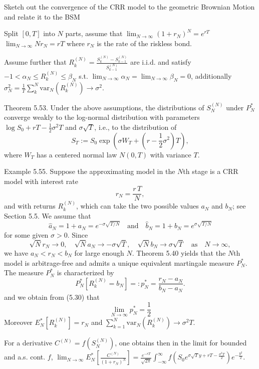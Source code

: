 Sketch out the convergence of the CRR
model to the geometric Brownian Motion
and relate it to the BSM

Split \( [0, T] \) into \( N \) parts, assume that
\( \lim_{N \to \infty} (1 + r_N)^N = e^{rT} \)
\( \lim_{N \to \infty} Nr_N = rT \)
where \( r_N \) is the rate of the riskless bond.

Assume further that
\( R^{(N)}_k = \frac{S^{(N)}_k - S^{(N)}_{k-1}}{S^{(N)}_{k-1}} \)
are i.i.d. and satisfy \( -1 < \alpha_N \leq R^{(N)}_k \leq \beta_N \)
s.t. \( \lim_{N \to \infty} \alpha_N = \lim_{N \to \infty} \beta_N = 0 \),
additionally \( \sigma_N^2 = \frac{1}{T} \sum_{k}^N \text{var}_N(R^{(N)}_k) \to \sigma^2 \).

Theorem 5.53. Under the above assumptions, the distributions of \( S^{(N)}_N \) under \( P^\ast_N \) converge weakly to the 
log-normal distribution with parameters \(\log S_0 + rT - \frac{1}{2} \sigma^2 T\) and \(\sigma \sqrt{T}\), i.e., to the distribution of
\[
S_T := S_0 \exp \left( \sigma W_T + \left( r - \frac{1}{2} \sigma^2 \right) T \right),
\]
where \( W_T \) has a centered normal law \( N(0,T) \) with variance \( T \).

Example 5.55. Suppose the approximating model in the \( N \)th stage is a CRR model with interest rate
\[
r_N = \frac{r \, T}{N},
\]
and with returns \( R^{(N)}_k \), which can take the two possible values \( a_N \) and \( b_N \); see Section 5.5. We assume that
\[
\hat{a}_N = 1 + a_N = e^{-\sigma \sqrt{T/N}} \quad \text{and} \quad \hat{b}_N = 1 + b_N = e^{\sigma \sqrt{T/N}}
\]
for some given \(\sigma > 0\). Since
\[
\sqrt{N} r_N \to 0, \quad \sqrt{N} a_N \to -\sigma \sqrt{T}, \quad \sqrt{N} b_N \to \sigma \sqrt{T} \quad \text{as} \quad N \to \infty,
\]
we have \( a_N < r_N < b_N \) for large enough \( N \). 
Theorem 5.40 yields that the \( N \)th model is arbitrage-free and admits a unique equivalent martingale measure \( P^*_N \). 
The measure \( P^*_N \) is characterized by
\[
P^*_N \left[ R^{(N)}_k = b_N \right] =: p^*_N = \frac{r_N - a_N}{b_N - a_N}.
\]
and we obtain from (5.30) that
\[
    \lim_{N \to \infty} p^\ast_N = \frac{1}{2}
\]
Moreover \( E^\ast_N[R^{(N)}_k] = r_N \) and
\( \sum_{k=1}^N \text{var}_N(R^{(N)}_k) \to \sigma^2T \).

For a derivative \( C^{(N)} = f(S^{(N)}_N) \), one obtains then in the limit
for bounded and a.s. cont. \( f \), 
\( \lim_{N \to \infty} E^\ast_N [ \frac{C^{(N)}}{(1 + r_N)^N}] = \frac{e^{-rT}}{\sqrt{2\pi}} \int_{-\infty}^\infty f(S_0 e^{\sigma \sqrt{T}y + rT - \frac{\sigma^2 T}{2}}) e^{-\frac{y^2}{2}} \).


